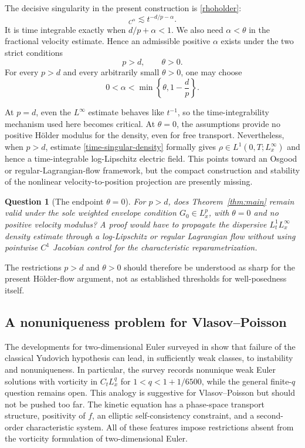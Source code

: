 \documentclass[11pt]{article}
\newtheorem{question}[theorem]{Question}
\begin{document}
The decisive singularity in the present construction is \eqref{rhoholder}:
\begin{equation*}
 [\rho(t)]_{C^\alpha}\lesssim t^{-d/p-\alpha}.
\end{equation*}
It is time integrable exactly when $d/p+\alpha<1$.  We also need
$\alpha<\theta$ in the fractional velocity estimate.  Hence an admissible
positive $\alpha$ exists under the two strict conditions
\begin{equation*}
 p>d,\qquad \theta>0.
\end{equation*}
For every $p>d$ and every arbitrarily small $\theta>0$, one may choose
\begin{equation*}
 0<\alpha<\min\left\{\theta,1-\frac dp\right\}.
\end{equation*}

At $p=d$, even the $L^\infty$ estimate behaves like $t^{-1}$, so the
time-integrability mechanism used here becomes critical.  At $\theta=0$, the
assumptions provide no positive H\"older modulus for the density, even for
free transport.  Nevertheless, when $p>d$, estimate
\eqref{time-singular-density} formally gives
$\rho\in L^1(0,T;L^\infty_x)$ and hence a time-integrable log-Lipschitz
electric field.  This points toward an Osgood or regular-Lagrangian-flow
framework, but the compact construction and stability of the nonlinear
velocity-to-position projection are presently missing.

\begin{question}[The endpoint $\theta=0$]
\label{op:endpoints}
For $p>d$, does Theorem~\ref{thm:main} remain valid under
the sole weighted envelope condition $G_0\in L^p_x$, with $\theta=0$ and no
positive velocity modulus?  A proof would have to propagate the dispersive
$L^1_tL^\infty_x$ density estimate through a log-Lipschitz or regular
Lagrangian flow without using pointwise $C^1$ Jacobian control for the
characteristic reparametrization.
\end{question}
The restrictions $p>d$ and $\theta>0$ should therefore be understood as
sharp for the present H\"older-flow argument, not as established thresholds
for well-posedness itself.

\subsection{A nonuniqueness problem for Vlasov--Poisson}

The developments for two-dimensional Euler surveyed in \cite{Brue} show
that failure of the classical Yudovich hypothesis can lead, in sufficiently
weak classes, to instability and nonuniqueness.  In particular, the survey
records nonunique weak Euler solutions with vorticity in $C_tL^q_x$ for
$1<q<1+1/6500$, while the general finite-$q$ question remains open.  This
analogy is suggestive for Vlasov--Poisson but should not be pushed too far.
The kinetic equation
has a phase-space transport structure, positivity of $f$, an elliptic
self-consistency constraint, and a second-order characteristic system.  All
of these features impose restrictions absent from the vorticity formulation
of two-dimensional Euler.
\end{document}
